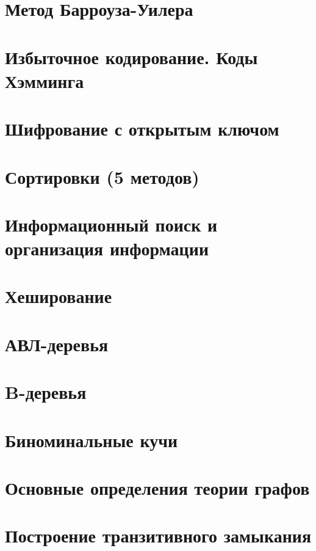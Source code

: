\documentclass[12pt, fleqn]{article}
\begin{document}
\section{Метод Барроуза-Уилера}


\section{Избыточное кодирование. Коды Хэмминга}


\section{Шифрование с открытым ключом}


\section{Сортировки (5 методов)}


\section{Информационный поиск и организация информации}


\section{Хеширование}


\section{АВЛ-деревья}


\section{B-деревья}


\section{Биноминальные кучи}


\section{Основные определения теории графов}


\section{Построение транзитивного замыкания}
\end{document}

